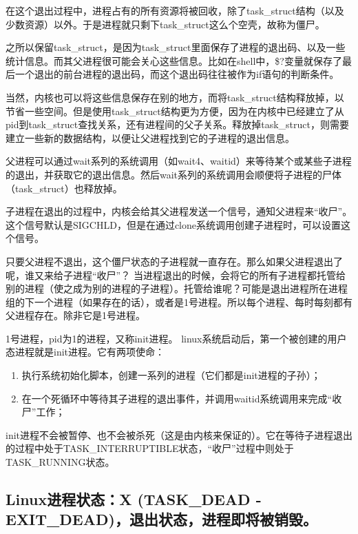 \documentclass[doctor,openright,twoside]{sjtuthesis}
\providecommand{\tightlist}{%
    \setlength{\itemsep}{0pt}\setlength{\parskip}{0pt}}
\theoremstyle{plain}
\theoremstyle{definition}
\theoremstyle{remark}
\theoremstyle{ocrenumbox}
\theoremstyle{plain}
\begin{document}
在这个退出过程中，进程占有的所有资源将被回收，除了task\_struct结构（以及少数资源）以外。于是进程就只剩下task\_struct这么个空壳，故称为僵尸。

之所以保留task\_struct，是因为task\_struct里面保存了进程的退出码、以及一些统计信息。而其父进程很可能会关心这些信息。比如在shell中，\$?变量就保存了最后一个退出的前台进程的退出码，而这个退出码往往被作为if语句的判断条件。

当然，内核也可以将这些信息保存在别的地方，而将task\_struct结构释放掉，以节省一些空间。但是使用task\_struct结构更为方便，因为在内核中已经建立了从pid到task\_struct查找关系，还有进程间的父子关系。释放掉task\_struct，则需要建立一些新的数据结构，以便让父进程找到它的子进程的退出信息。

父进程可以通过wait系列的系统调用（如wait4、waitid）来等待某个或某些子进程的退出，并获取它的退出信息。然后wait系列的系统调用会顺便将子进程的尸体（task\_struct）也释放掉。

子进程在退出的过程中，内核会给其父进程发送一个信号，通知父进程来``收尸''。这个信号默认是SIGCHLD，但是在通过clone系统调用创建子进程时，可以设置这个信号。

只要父进程不退出，这个僵尸状态的子进程就一直存在。那么如果父进程退出了呢，谁又来给子进程``收尸''？
当进程退出的时候，会将它的所有子进程都托管给别的进程（使之成为别的进程的子进程）。托管给谁呢？可能是退出进程所在进程组的下一个进程（如果存在的话），或者是1号进程。所以每个进程、每时每刻都有父进程存在。除非它是1号进程。

1号进程，pid为1的进程，又称init进程。
linux系统启动后，第一个被创建的用户态进程就是init进程。它有两项使命：

\begin{enumerate}
\def\labelenumi{\arabic{enumi}.}
\tightlist
\item
  执行系统初始化脚本，创建一系列的进程（它们都是init进程的子孙）；
\item
  在一个死循环中等待其子进程的退出事件，并调用waitid系统调用来完成``收尸''工作；
\end{enumerate}

init进程不会被暂停、也不会被杀死（这是由内核来保证的）。它在等待子进程退出的过程中处于TASK\_INTERRUPTIBLE状态，``收尸''过程中则处于TASK\_RUNNING状态。

\hypertarget{linuxx-task_dead---exit_dead}{%
\subsection{Linux进程状态：X (TASK\_DEAD -
EXIT\_DEAD)，退出状态，进程即将被销毁。}\label{linuxx-task_dead---exit_dead}}
\end{document}
